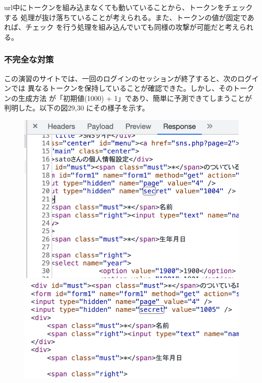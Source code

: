 \documentclass[dvipdfmx,autodetect-engine,titlepage]{jsarticle}
\begin{document}
url中にトークンを組み込まなくても動いていることから、トークンをチェックする
処理が抜け落ちていることが考えられる。また、トークンの値が固定であれば、チェック
を行う処理を組み込んでいても同様の攻撃が可能だと考えられる。

\subsubsection*{不完全な対策}
この演習のサイトでは、一回のログインのセッションが終了すると、次のログインでは
異なるトークンを保持していることが確認できた。しかし、そのトークンの生成方法
が「初期値(1000) + 1」であり、簡単に予測できてしまうことが判明した。以下の図29,30
にその様子を示す。

\begin{figure}[h]
  \centering
  \begin{minipage}[b]{0.45\linewidth}
  \begin{center}
    \includegraphics[keepaspectratio,scale=0.5]{pic28.png}
    \end{center}
    \caption{}
  \end{minipage}
  \begin{minipage}[b]{0.45\linewidth}
  \begin{center}
    \includegraphics[keepaspectratio,scale=0.6]{pic29.png}
    \end{center}
    \caption{}
  \end{minipage}
\end{figure}
\end{document}
